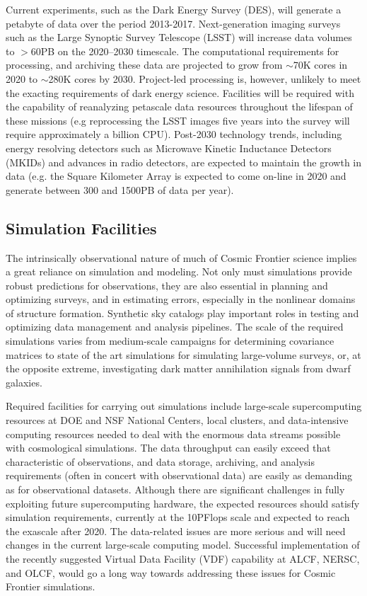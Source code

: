 Current experiments, such as the Dark Energy Survey (DES), will
generate a petabyte of data over the period 2013-2017. Next-generation
imaging surveys such as the Large Synoptic Survey Telescope (LSST)
will increase data volumes to $>$60PB on the 2020--2030 timescale. The
computational requirements for processing, and archiving these data
are projected to grow from $\sim$70K cores in 2020 to $\sim$280K cores
by 2030. Project-led processing is, however, unlikely to meet the
exacting requirements of dark energy science. Facilities will be
required with the capability of reanalyzing petascale data resources
throughout the lifespan of these missions (e.g reprocessing the LSST
images five years into the survey will require approximately a billion
CPU). Post-2030 technology trends, including energy resolving
detectors such as Microwave Kinetic Inductance Detectors (MKIDs) and
advances in radio detectors, are expected to maintain the growth in
data (e.g. the Square Kilometer Array is expected to come on-line in
2020 and generate between 300 and 1500PB of data per year).

\subsection{Simulation Facilities}

The intrinsically observational nature of much of Cosmic Frontier
science implies a great reliance on simulation and modeling. Not only
must simulations provide robust predictions for observations, they are
also essential in planning and optimizing surveys, and in estimating
errors, especially in the nonlinear domains of structure
formation. Synthetic sky catalogs play important roles in testing and
optimizing data management and analysis pipelines. The scale of the
required simulations varies from medium-scale campaigns for
determining covariance matrices to state of the art simulations for
simulating large-volume surveys, or, at the opposite extreme,
investigating dark matter annihilation signals from dwarf galaxies.

Required facilities for carrying out simulations include large-scale
supercomputing resources at DOE and NSF National Centers, local
clusters, and data-intensive computing resources needed to deal with
the enormous data streams possible with cosmological simulations. The
data throughput can easily exceed that characteristic of observations,
and data storage, archiving, and analysis requirements (often in
concert with observational data) are easily as demanding as for
observational datasets. Although there are significant challenges in
fully exploiting future supercomputing hardware, the expected
resources should satisfy simulation requirements, currently at the
10PFlops scale and expected to reach the exascale after 2020. The
data-related issues are more serious and will need changes in the
current large-scale computing model. Successful implementation of the
recently suggested Virtual Data Facility (VDF) capability at ALCF,
NERSC, and OLCF, would go a long way towards addressing these issues
for Cosmic Frontier simulations.

